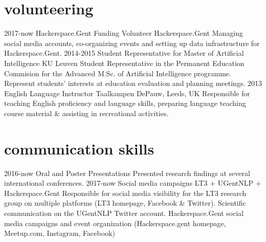 \documentclass[]{friggeri-cv-a4}
\begin{document}
\section{volunteering}
\begin{entrylist}
    \entry
        {2017-now}
        {Hackerspace.Gent Funding Volunteer}
        {Hackerspace.Gent}
        {Managing social media accounts, co-organizing events and setting up data infrastructure for Hackerspace.Gent.}
    \entry
        {2014-2015}
        {Student Representative for Master of Artificial Intelligence}
        {KU Leuven}
        {Student Representative in the Permanent Education Commision for the Advanced M.Sc. of Artificial Intelligence programme. Represent students' interests at education evaluation and planning meetings.}
    \entry
        {2013}
        {English Language Instructor}
        {Taalkampen DePauw, Leeds, UK}
        {Responsible for teaching English proficiency and language skills, preparing language teaching course material \& assisting in recreational activities.}
\end{entrylist}

\section{communication skills}
\begin{entrylist}
    \entry
        {2016-now}
        {Oral and Poster Presentations}
        {}
        {Presented research findings at several international conferences.}
    \entry
        {2017-now}
        {Social media campaigns}
        {LT3 + UGentNLP + Hackerspace.Gent}
        {Responsible for social media visibility for the LT3 research group on multiple platforms (LT3 homepage, Facebook \& Twitter). Scientific communication on the UGentNLP Twitter account. Hackerspace.Gent social media campaigns and event organization (Hackerspace.gent homepage, Meetup.com, Instagram, Facebook)}
\end{entrylist}

\end{document}
